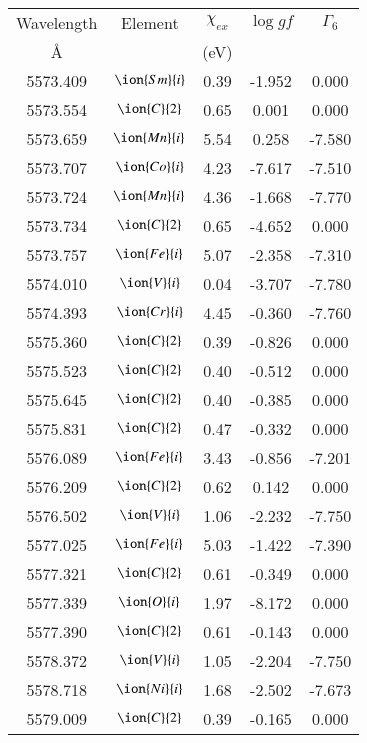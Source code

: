 \documentclass[fleqn,usenatbib]{mnras}
\begin{document}
\begin{center}
 \begin{table}
 \begin{tabular}{ccccc}
 \hline
 Wavelength & Element & $\chi_{ex}$ &  $\log gf$ & $\varGamma_{6}$ \\
   \AA{}    &         &  (eV)       &            &                  \\
 \hline
5573.409 &  $\ion{Sm}{i}$  & 0.39 & -1.952 & 0.000 \\ 
5573.554 &  $\ion{C}{2}$ & 0.65 & 0.001 & 0.000 \\ 
5573.659 &  $\ion{Mn}{i}$  & 5.54 & 0.258 & -7.580 \\ 
5573.707 &  $\ion{Co}{i}$  & 4.23 & -7.617 & -7.510 \\ 
5573.724 &  $\ion{Mn}{i}$  & 4.36 & -1.668 & -7.770 \\ 
5573.734 &  $\ion{C}{2}$ & 0.65 & -4.652 & 0.000 \\ 
5573.757 &  $\ion{Fe}{i}$  & 5.07 & -2.358 & -7.310 \\ 
5574.010 &  $\ion{V}{i}$  & 0.04 & -3.707 & -7.780 \\ 
5574.393 &  $\ion{Cr}{i}$  & 4.45 & -0.360 & -7.760 \\ 
5575.360 &  $\ion{C}{2}$ & 0.39 & -0.826 & 0.000 \\ 
5575.523 &  $\ion{C}{2}$ & 0.40 & -0.512 & 0.000 \\ 
5575.645 &  $\ion{C}{2}$ & 0.40 & -0.385 & 0.000 \\ 
5575.831 &  $\ion{C}{2}$ & 0.47 & -0.332 & 0.000 \\ 
5576.089 &  $\ion{Fe}{i}$  & 3.43 & -0.856 & -7.201 \\ 
5576.209 &  $\ion{C}{2}$ & 0.62 & 0.142 & 0.000 \\ 
5576.502 &  $\ion{V}{i}$  & 1.06 & -2.232 & -7.750 \\ 
5577.025 &  $\ion{Fe}{i}$  & 5.03 & -1.422 & -7.390 \\ 
5577.321 &  $\ion{C}{2}$ & 0.61 & -0.349 & 0.000 \\ 
5577.339 &  $\ion{O}{i}$  & 1.97 & -8.172 & 0.000 \\ 
5577.390 &  $\ion{C}{2}$ & 0.61 & -0.143 & 0.000 \\ 
5578.372 &  $\ion{V}{i}$  & 1.05 & -2.204 & -7.750 \\ 
5578.718 &  $\ion{Ni}{i}$  & 1.68 & -2.502 & -7.673 \\ 
5579.009 &  $\ion{C}{2}$ & 0.39 & -0.165 & 0.000 \\ 

\end{tabular}
\end{table}
\end{center}
\end{document}
